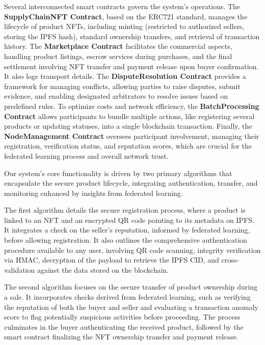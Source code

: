 \documentclass[conference]{IEEEtran}
\begin{document}
Several interconnected smart contracts govern the system's operations. The \textbf{SupplyChainNFT Contract}, based on the ERC721 standard, manages the lifecycle of product NFTs, including minting (restricted to authorized sellers, storing the IPFS hash), standard ownership transfers, and retrieval of transaction history. The \textbf{Marketplace Contract} facilitates the commercial aspects, handling product listings, escrow services during purchases, and the final settlement involving NFT transfer and payment release upon buyer confirmation. It also logs transport details. The \textbf{DisputeResolution Contract} provides a framework for managing conflicts, allowing parties to raise disputes, submit evidence, and enabling designated arbitrators to resolve issues based on predefined rules. To optimize costs and network efficiency, the \textbf{BatchProcessing Contract} allows participants to bundle multiple actions, like registering several products or updating statuses, into a single blockchain transaction. Finally, the \textbf{NodeManagement Contract} oversees participant involvement, managing their registration, verification status, and reputation scores, which are crucial for the federated learning process and overall network trust.

Our system's core functionality is driven by two primary algorithms that encapsulate the secure product lifecycle, integrating authentication, transfer, and monitoring enhanced by insights from federated learning. 


The first algorithm details the secure registration process, where a product is linked to an NFT and an encrypted QR code pointing to its metadata on IPFS. It integrates a check on the seller's reputation, informed by federated learning, before allowing registration. It also outlines the comprehensive authentication procedure available to any user, involving QR code scanning, integrity verification via HMAC, decryption of the payload to retrieve the IPFS CID, and cross-validation against the data stored on the blockchain.

The second algorithm focuses on the secure transfer of product ownership during a sale. It incorporates checks derived from federated learning, such as verifying the reputation of both the buyer and seller and evaluating a transaction anomaly score to flag potentially suspicious activities before proceeding. The process culminates in the buyer authenticating the received product, followed by the smart contract finalizing the NFT ownership transfer and payment release. 
\end{document}
